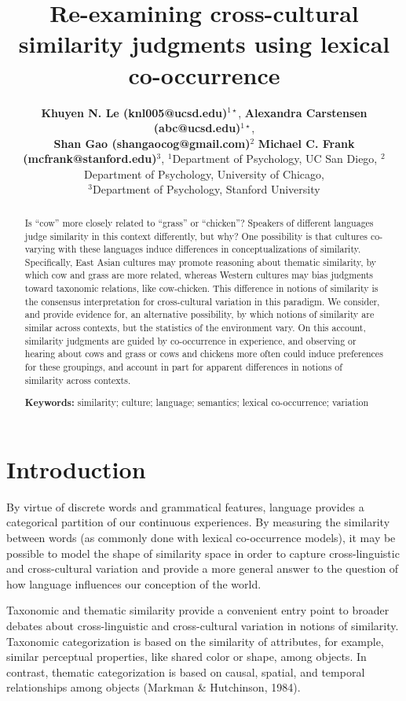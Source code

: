 \documentclass[10pt, letterpaper]{article}
\title{Re-examining cross-cultural similarity judgments using lexical
co-occurrence}
\author{{\large \bf Khuyen N. Le (knl005@ucsd.edu)}$^{1\star}$, {\large \bf Alexandra Carstensen (abc@ucsd.edu)}$^{1\star}$, \\ {\large \bf Shan Gao (shangaocog@gmail.com)$^2$} {\large \bf Michael C. Frank (mcfrank@stanford.edu)$^3$},  \AND $^1$Department of Psychology, UC San Diego, $^2$Department of Psychology, University of Chicago, \\ $^3$Department of Psychology, Stanford University }
\begin{document}
\maketitle

\begin{abstract}
Is ``cow'' more closely related to ``grass'' or ``chicken''? Speakers of
different languages judge similarity in this context differently, but
why? One possibility is that cultures co-varying with these languages
induce differences in conceptualizations of similarity. Specifically,
East Asian cultures may promote reasoning about thematic similarity, by
which cow and grass are more related, whereas Western cultures may bias
judgments toward taxonomic relations, like cow-chicken. This difference
in notions of similarity is the consensus interpretation for
cross-cultural variation in this paradigm. We consider, and provide
evidence for, an alternative possibility, by which notions of similarity
are similar across contexts, but the statistics of the environment vary.
On this account, similarity judgments are guided by co-occurrence in
experience, and observing or hearing about cows and grass or cows and
chickens more often could induce preferences for these groupings, and
account in part for apparent differences in notions of similarity across
contexts.

\textbf{Keywords:}
similarity; culture; language; semantics; lexical co-occurrence;
variation
\end{abstract}

\hypertarget{introduction}{%
\section{Introduction}\label{introduction}}

By virtue of discrete words and grammatical features, language provides
a categorical partition of our continuous experiences. By measuring the
similarity between words (as commonly done with lexical co-occurrence
models), it may be possible to model the shape of similarity space in
order to capture cross-linguistic and cross-cultural variation and
provide a more general answer to the question of how language influences
our conception of the world.

Taxonomic and thematic similarity provide a convenient entry point to
broader debates about cross-linguistic and cross-cultural variation in
notions of similarity. Taxonomic categorization is based on the
similarity of attributes, for example, similar perceptual properties,
like shared color or shape, among objects. In contrast, thematic
categorization is based on causal, spatial, and temporal relationships
among objects (Markman \& Hutchinson, 1984).
\end{document}
